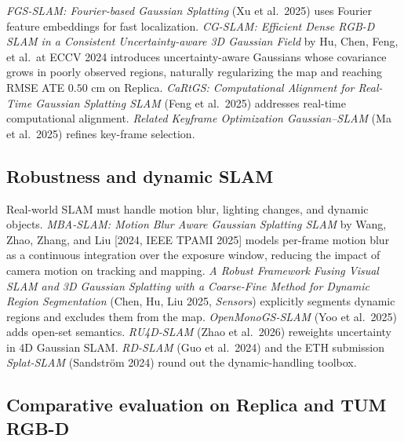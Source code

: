 \documentclass{article}
\begin{document}
\emph{FGS-SLAM: Fourier-based Gaussian Splatting} (Xu et al.~2025) uses Fourier feature embeddings for fast localization. \emph{CG-SLAM: Efficient Dense RGB-D SLAM in a Consistent Uncertainty-aware 3D Gaussian Field} by Hu, Chen, Feng, et al.~at ECCV 2024 \cite{hu2024cgslamefficientden} introduces uncertainty-aware Gaussians whose covariance grows in poorly observed regions, naturally regularizing the map and reaching RMSE ATE \(0.50\) cm on Replica. \emph{CaRtGS: Computational Alignment for Real-Time Gaussian Splatting SLAM} (Feng et al.~2025) addresses real-time computational alignment. \emph{Related Keyframe Optimization Gaussian--SLAM} (Ma et al.~2025) refines key-frame selection.

\subsection{Robustness and dynamic SLAM}\label{robustness-and-dynamic-slam}

Real-world SLAM must handle motion blur, lighting changes, and dynamic objects. \emph{MBA-SLAM: Motion Blur Aware Gaussian Splatting SLAM} by Wang, Zhao, Zhang, and Liu {[}2024, IEEE TPAMI 2025{]} models per-frame motion blur as a continuous integration over the exposure window, reducing the impact of camera motion on tracking and mapping. \emph{A Robust Framework Fusing Visual SLAM and 3D Gaussian Splatting with a Coarse-Fine Method for Dynamic Region Segmentation} (Chen, Hu, Liu 2025, \emph{Sensors}) explicitly segments dynamic regions and excludes them from the map. \emph{OpenMonoGS-SLAM} (Yoo et al.~2025) adds open-set semantics. \emph{RU4D-SLAM} (Zhao et al.~2026) reweights uncertainty in 4D Gaussian SLAM. \emph{RD-SLAM} (Guo et al.~2024) and the ETH submission \emph{Splat-SLAM} (Sandström 2024) round out the dynamic-handling toolbox.

\subsection{Comparative evaluation on Replica and TUM RGB-D}\label{comparative-evaluation-on-replica-and-tum-rgb-d}
\end{document}
